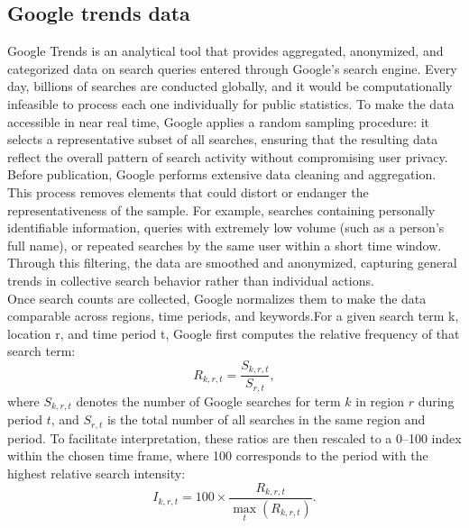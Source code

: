 \documentclass[12pt,a4paper]{article}
\begin{document}
\subsection{Google trends data}
Google Trends is an analytical tool that provides aggregated, anonymized, and categorized data on search queries entered through Google’s search engine. Every day, billions of searches are conducted globally, and it would be computationally infeasible to process each one individually for public statistics. To make the data accessible in near real time, Google applies a random sampling procedure: it selects a representative subset of all searches, ensuring that the resulting data reflect the overall pattern of search activity without compromising user privacy.\\
Before publication, Google performs extensive data cleaning and aggregation. This process removes elements that could distort or endanger the representativeness of the sample. For example, searches containing personally identifiable information, queries with extremely low volume (such as a person’s full name), or repeated searches by the same user within a short time window. Through this filtering, the data are smoothed and anonymized, capturing general trends in collective search behavior rather than individual actions.\\
Once search counts are collected, Google normalizes them to make the data comparable across regions, time periods, and keywords.For a given search term k, location r, and time period t, Google first computes the relative frequency of that search term:
\begin{equation}
R_{k,r,t} = \frac{S_{k,r,t}}{S_{r,t}},
\end{equation}
where \(S_{k,r,t}\) denotes the number of Google searches for term \(k\) in region \(r\) during period \(t\), and \(S_{r,t}\) is the total number of all searches in the same region and period.
To facilitate interpretation, these ratios are then rescaled to a 0–100 index within the chosen time frame, where 100 corresponds to the period with the highest relative search intensity:
\begin{equation}
I_{k,r,t} = 100 \times \frac{R_{k,r,t}}{\max_{t}(R_{k,r,t})}.
\end{equation}
\end{document}
